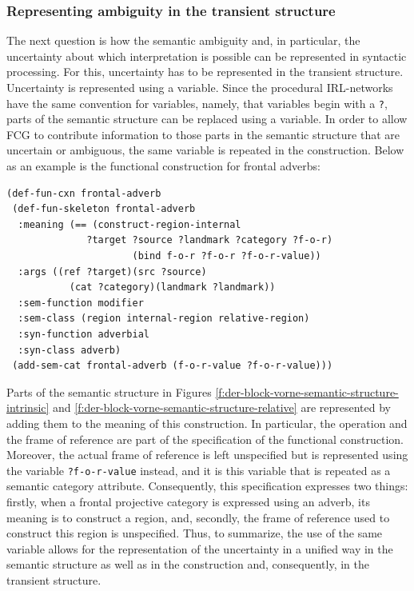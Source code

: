 \subsubsection*{Representing ambiguity in the transient structure}
The next question is how the semantic ambiguity and, in particular, the
uncertainty about which interpretation is possible can be represented 
in syntactic processing. For this, uncertainty has to be represented in the 
transient structure. Uncertainty is represented using a variable. 
Since the procedural IRL-networks have the same convention for variables, 
namely, that variables begin with a {\footnotesize\tt ?}, parts of the 
semantic structure can be replaced using a variable. 
In order to allow FCG to contribute information to those parts in the semantic 
structure that are uncertain or ambiguous, the same variable is repeated in the 
construction. Below as an example is the functional construction for frontal adverbs:

\begin{example}
\label{e:def-fun-frontal-adverb}
\begin{footnotesize}
\begin{Verbatim}[commandchars=\\\{\}]
(def-fun-cxn frontal-adverb 
 (def-fun-skeleton frontal-adverb
  :meaning (== (construct-region-internal 
              ?target ?source ?landmark ?category ?f-o-r)
                      (bind f-o-r ?f-o-r ?f-o-r-value))
  :args ((ref ?target)(src ?source)
           (cat ?category)(landmark ?landmark))
  :sem-function modifier
  :sem-class (region internal-region relative-region)
  :syn-function adverbial
  :syn-class adverb)
 (add-sem-cat frontal-adverb (f-o-r-value ?f-o-r-value)))
\end{Verbatim}
\end{footnotesize}
\end{example}

Parts of the semantic structure in Figures 
\ref{f:der-block-vorne-semantic-structure-intrinsic} and 
\ref{f:der-block-vorne-semantic-structure-relative} are represented by 
adding them to the meaning of this construction.
In particular, the operation and the frame of reference are part of the 
specification of the functional construction. 
Moreover, the actual frame of reference is left unspecified but is 
represented using the variable {\footnotesize\tt ?f-o-r-value}
instead, and it is this variable that is repeated as a semantic category 
attribute. Consequently, this specification
expresses two things: firstly, when a frontal projective category is 
expressed using an adverb, its 
meaning is to construct a region, and, secondly, the frame of reference used 
to construct this region is unspecified.
Thus, to summarize, the use of the same variable allows for the representation 
of the uncertainty in a unified way in the semantic structure 
as well as in the construction and, consequently, in the transient structure.

